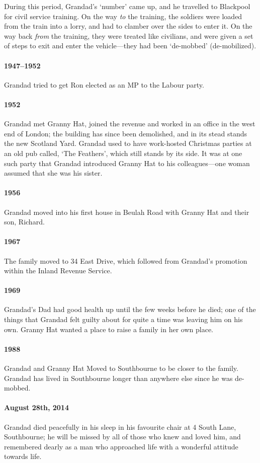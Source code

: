 \documentclass[11pt]{article}
\newcommand{\fixthis}[1]
{%
	\marginpar{\huge  {\framebox{FIX}}}%
	\typeout{FIXTHIS: p\thepage : #1^^J}%
}
\begin{document}
  During this period, Grandad's `number' came up, and he travelled to Blackpool for 
  civil service training. On the way \emph{to} the training, the soldiers were loaded from 
  the train into a lorry, and had to clamber over the sides to enter it. On the 
  way back \emph{from} the training, they were treated like civilians, and were 
  given a set of steps to exit and enter the vehicle---they had been `de-mobbed' (de-mobilized).

  \paragraph{1947--1952} Grandad tried to get Ron elected as an MP to the Labour party. \fixthis{expand on this!}

\paragraph{1952} Grandad met Granny Hat, joined the revenue and worked in an office 
  in the west end of London; the building has since been demolished, and in its stead 
  stands the new Scotland Yard. 
  Grandad used to have work-hosted Christmas parties at an old pub called, `The Feathers', which still stands by its side. 
  It was at one such party that Grandad introduced Granny Hat to his colleagues---one woman
  assumed that she was his sister.

\paragraph{1956} Grandad moved into his first house in Beulah Road with Granny Hat and their son, Richard.
\paragraph{1967} The family moved to 34 East Drive, which followed from Grandad's promotion within 
the Inland Revenue Service.
\paragraph{1969} Grandad's Dad had good health up until the few weeks before he died; one 
of the things that Grandad felt guilty about for quite a time was leaving him on his own. Granny Hat  wanted 
a place to raise a family in her own place.
\paragraph{1988} Grandad and Granny Hat Moved to Southbourne to be closer to the family. Grandad 
  has lived in Southbourne longer than anywhere else since he was de-mobbed.

  \paragraph{August 28th, 2014} Grandad died peacefully in his sleep in his favourite chair at 4 South Lane, Southbourne; he will be missed by all of those
  who knew and loved him, and remembered dearly as a man who approached life with a wonderful attitude
  towards life.
\end{document}

